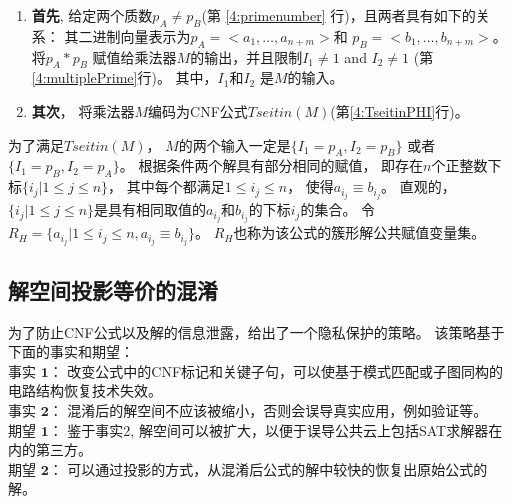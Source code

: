 %

\begin{enumerate}
\item \textbf{首先},
给定两个质数$p_A \neq p_B$(第 \ref{4:primenumber} 行)，且两者具有如下的关系：
其二进制向量表示为$p_A=<a_1,\dots,a_{n+m}>$和
$p_B=<b_1,\dots,b_{n+m}>$。
将$p_A * p_B$ 赋值给乘法器$M$的输出，并且限制$I_1\ne 1$ and  $I_2\ne 1$ (第\ref{4:multiplePrime}行)。
其中，$I_1$和$I_2$ 是$M$的输入。

\item \textbf{其次}，
将乘法器$M$编码为CNF公式$Tseitin(M)$(第\ref{4:TseitinPHI}行)。
\end{enumerate}

为了满足$Tseitin(M)$，
$M$的两个输入一定是$\{I_1=p_A,I_2=p_B\}$ 或者 $\{I_1=p_B,I_2=p_A\}$。
根据条件两个解具有部分相同的赋值，
即存在$n$个正整数下标$\{i_j|1\le j\le n\}$，
其中每个都满足$1\le i_j\le n$，
使得$a_{i_j}\equiv b_{i_j}$。
直观的，
$\{i_j|1\le j\le n\}$是具有相同取值的$a_{i_j}$和$b_{i_j}$的下标$i_j$的集合。
令$R_H=\{a_{i_j}|1\le i_j\le n,a_{i_j}\equiv b_{i_j}\}$。
$R_H$也称为该公式的簇形解公共赋值变量集。



\subsection{解空间投影等价的混淆}\label{4:obfuscating}

为了防止CNF公式以及解的信息泄露，给出了一个隐私保护的策略。
该策略基于下面的事实和期望：
\\$\textbf{事实 1：}$ 改变公式中的CNF标记和关键子句，可以使基于模式匹配或子图同构的电路结构恢复技术失效。
\\$\textbf{事实 2：}$ 混淆后的解空间不应该被缩小，否则会误导真实应用，例如验证等。
\\$\textbf{期望 1：}$ 鉴于事实2, 解空间可以被扩大，以便于误导公共云上包括SAT求解器在内的第三方。
\\$\textbf{期望 2：}$ 可以通过投影的方式，从混淆后公式的解中较快的恢复出原始公式的解。

